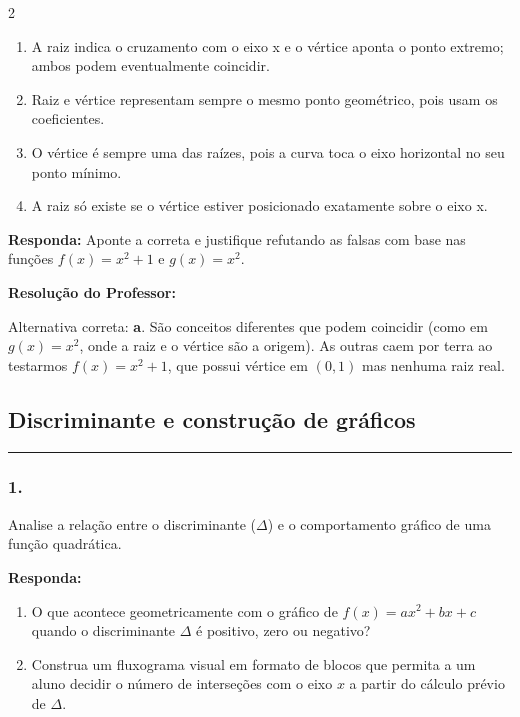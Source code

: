 \begin{multicols*}{2}
\begin{enumerate}[label=\alph*), itemsep=\espacoAlt]
\item A raiz indica o cruzamento com o eixo x e o vértice aponta o ponto extremo; ambos podem eventualmente coincidir.
\item Raiz e vértice representam sempre o mesmo ponto geométrico, pois usam os coeficientes.
\item O vértice é sempre uma das raízes, pois a curva toca o eixo horizontal no seu ponto mínimo.
\item A raiz só existe se o vértice estiver posicionado exatamente sobre o eixo x.
\end{enumerate}

\begin{boxresponda}
\textbf{Responda:} Aponte a correta e justifique refutando as falsas com base nas funções $f(x) = x^2 + 1$ e $g(x) = x^2$.
\end{boxresponda}

\ifgabarito
    \begin{tcolorbox}[colback=CorTitUm!5, colframe=CorTitUm, boxrule=1pt, arc=4pt, left=6pt, right=6pt, top=6pt, bottom=6pt]
    \small\textbf{\textcolor{CorTitUm}{Resolução do Professor:}}\par\vspace{0.1cm}
    \color{CinzaEscuro}
    Alternativa correta: \textbf{a}. São conceitos diferentes que podem coincidir (como em $g(x)=x^2$, onde a raiz e o vértice são a origem). As outras caem por terra ao testarmos $f(x)=x^2+1$, que possui vértice em $(0,1)$ mas nenhuma raiz real.
    \end{tcolorbox}
\fi

\par\vspace{\espacoQuestao}
\subsection*{Discriminante e construção de gráficos}
\vspace{-0.2cm}\noindent\rule{\linewidth}{1.5pt} 
\par\vspace{\espacoPosTitulo}
\subsubsection*{1.} Analise a relação entre o discriminante ($\Delta$) e o comportamento gráfico de uma função quadrática. 

\begin{boxresponda}
\textbf{Responda:} 
\begin{enumerate}[label=\alph*), itemsep=\espacoAlt]
\item O que acontece geometricamente com o gráfico de $f(x) = ax^2 + bx + c$ quando o discriminante $\Delta$ é positivo, zero ou negativo?
\item Construa um fluxograma visual em formato de blocos que permita a um aluno decidir o número de interseções com o eixo $x$ a partir do cálculo prévio de $\Delta$.
\end{enumerate}
\end{boxresponda}


\end{multicols*}
